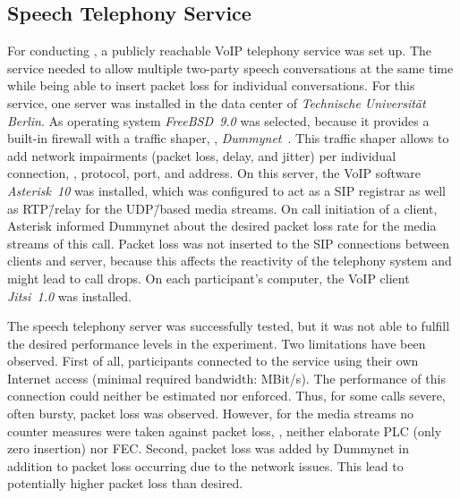 \subsection{Speech Telephony Service}
For conducting , a publicly reachable \ac{VoIP} telephony service was set up.
The service needed to allow multiple two-party speech conversations at the same time while being able to insert packet loss for individual conversations.
For this service, one server was installed in the data center of \emph{Technische Universität Berlin}.
As operating system \emph{FreeBSD~9.0} was selected, because it provides a built-in firewall with a traffic shaper, \ie, \emph{Dummynet}~\citep{rizzo_dummynet:_1997}.
This traffic shaper allows to add network impairments (packet loss, delay, and jitter) per individual connection, \ie, protocol, port, and address.
On this server, the \ac{VoIP} software \emph{Asterisk~10} was installed, which was configured to act as a \ac{SIP} registrar as well as \acs{RTP}\=/relay for the \acs{UDP}\=/based media streams.
On call initiation of a client, Asterisk informed Dummynet about the desired packet loss rate for the media streams of this call.
Packet loss was not inserted to the \ac{SIP} connections between clients and server, because this affects the reactivity of the telephony system and might lead to call drops.
On each participant's computer, the \ac{VoIP} client \emph{Jitsi~1.0} was installed.

The speech telephony server was successfully tested, but it was not able to fulfill the desired performance levels in the experiment.
Two limitations have been observed.
First of all, participants connected to the service using their own Internet access (minimal required bandwidth: \unit[6]{MBit/s}).
The performance of this connection could neither be estimated nor enforced.
Thus, for some calls severe, often bursty, packet loss was observed.
However, for the media streams no counter measures were taken against packet loss, \ie, neither elaborate \acs{PLC} (only zero insertion) nor \acs{FEC}. 
Second, packet loss was added by Dummynet in addition to packet loss occurring due to the network issues.
This lead to potentially higher packet loss than desired.

